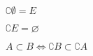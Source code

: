 \begin{proposition}
$\complement{\emptyset} = E$
\end{proposition}

\begin{proposition}
$\complement{E} = \varnothing$
\end{proposition}

\begin{proposition}
$A \subset B \iff \complement{B} \subset \complement{A}$
\end{proposition}


